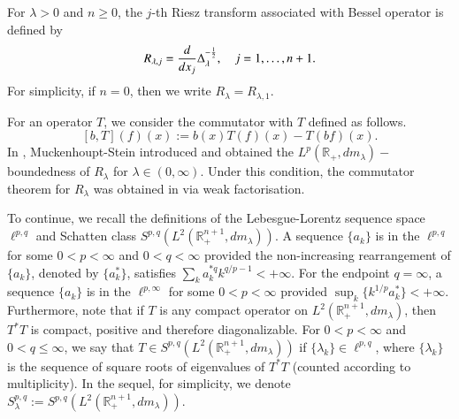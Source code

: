 \documentclass[12pt]{amsart}
\begin{document}

For $\lambda>0$ and $n\geq 0$, the $j$-th Riesz transform associated with Bessel operator is defined by
$$ R_{\lambda,j} = {d\over dx_j} \Delta_\lambda^{-{1\over2}},\quad j=1,\ldots,n+1. $$
For simplicity, if $n=0$, then we write $R_\lambda=R_{\lambda,1}$.

For an operator $T$, we consider the commutator with $T$ defined as follows.
$$[b,T](f)(x):= b(x)T(f)(x) - T(bf)(x).  $$
In \cite{MS}, Muckenhoupt-Stein introduced and obtained the $L^p(\mathbb{R}_{+},dm_\lambda)-$boundedness of $R_\lambda$ for $\lambda\in (0,\infty)$. Under this condition, the commutator theorem for $R_\lambda$
was obtained in \cite{DLWY} via weak factorisation.


To continue, we recall the definitions of the Lebesgue-Lorentz sequence space $\ell^{p,q}$ and Schatten class $S^{p,q}(L^2(\mathbb{R}_{+}^{n+1},dm_\lambda))$. A sequence $\{a_k\}$ is in the $\ell^{p,q}$ for some $0<p<\infty$ and $0<q<\infty$ provided the non-increasing rearrangement of $\{a_k\}$, denoted by $\{a_k^*\}$, satisfies $\sum_{k}a_k^{*q}k^{q/p-1}<+\infty$. For the endpoint $q=\infty$, a sequence $\{a_k\}$ is in the $\ell^{p,\infty}$ for some $0<p<\infty$ provided $\sup_{k}\{k^{1/p}a_k^{*}\}<+\infty$. Furthermore, note that if $T$ is any compact operator on $L^{2}(\mathbb{R}_+^{n+1},dm_\lambda)$, then $T^{*}T$ is compact, positive and therefore diagonalizable. For $0<p<\infty$ and $0<q\leq \infty$, we say that $T\in S^{p,q}(L^2(\mathbb{R}_{+}^{n+1},dm_\lambda))$ if $\{\lambda_{k}\}\in \ell^{p,q}$, where $\{\lambda_{k}\}$ is the sequence of square roots of eigenvalues of $T^{*}T$ (counted according to multiplicity). In the sequel, for simplicity, we denote $S_\lambda^{p,q}:=S^{p,q}(L^2(\mathbb{R}_{+}^{n+1},dm_\lambda))$.
\end{document}
